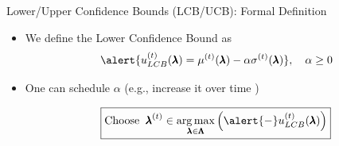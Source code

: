 \begin{frame}[c]{Lower/Upper Confidence Bounds (LCB/UCB): Formal Definition}
\begin{itemize}
    \item We define the \alert{Lower Confidence Bound} as
    \[\alert{\iter{\acq}_{LCB}(\conf) = \iter{\mean}(\conf) - \alpha\iter{\stddev}(\conf)},\quad\alpha\geq0\]

\bigskip
    \item One can schedule $\alpha$ (e.g., increase it over time )

\[
    \boxed{\text{Choose}\;\;\bonextsample \in \argmax_{\conf\in\pcs}\left(\alert{-} \iter{\acq}_{LCB}(\conf)\right)}
\]

\end{itemize}
    \bigskip
    \fhpause
    
\end{frame}
